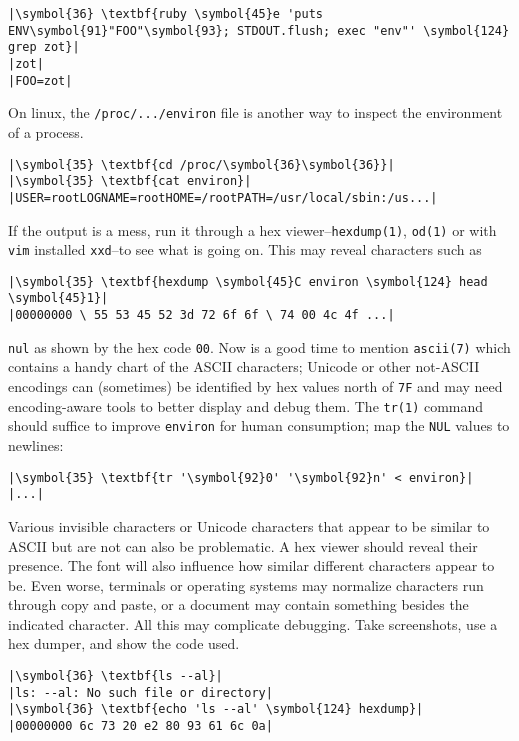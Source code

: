 \documentclass[10pt,a4paper]{article}
\begin{document}
\begin{lstlisting}
|\symbol{36} \textbf{ruby \symbol{45}e 'puts ENV\symbol{91}"FOO"\symbol{93}; STDOUT.flush; exec "env"' \symbol{124} grep zot}|
|zot|
|FOO=zot|
\end{lstlisting}

On linux, the \texttt{/proc/.../environ} file is another way to inspect
the environment of a process.

\begin{lstlisting}
|\symbol{35} \textbf{cd /proc/\symbol{36}\symbol{36}}|
|\symbol{35} \textbf{cat environ}|
|USER=rootLOGNAME=rootHOME=/rootPATH=/usr/local/sbin:/us...|
\end{lstlisting}

If the output is a mess, run it through a hex
viewer--\texttt{hexdump(1)}, \texttt{od(1)} or with \texttt{vim}
installed \texttt{xxd}--to see what is going on. This may reveal
characters such as

\begin{lstlisting}
|\symbol{35} \textbf{hexdump \symbol{45}C environ \symbol{124} head \symbol{45}1}|
|00000000 \ 55 53 45 52 3d 72 6f 6f \ 74 00 4c 4f ...|
\end{lstlisting}

\texttt{nul} as shown by the hex code \texttt{00}. Now is a good time to
mention \texttt{ascii(7)} which contains a handy chart of the ASCII
characters; Unicode or other not-ASCII encodings can (sometimes) be
identified by hex values north of \texttt{7F} and may need
encoding-aware tools to better display and debug them. The
\texttt{tr(1)} command should suffice to improve \texttt{environ} for
human consumption; map the \texttt{NUL} values to newlines:

\begin{lstlisting}
|\symbol{35} \textbf{tr '\symbol{92}0' '\symbol{92}n' < environ}|
|...|
\end{lstlisting}

Various invisible characters or Unicode characters that appear to be
similar to ASCII but are not can also be problematic. A hex viewer
should reveal their presence. The font will also influence how similar
different characters appear to be. Even worse, terminals or operating
systems may normalize characters run through copy and paste, or a
document may contain something besides the indicated character. All this
may complicate debugging. Take screenshots, use a hex dumper, and show
the code used.

\begin{lstlisting}
|\symbol{36} \textbf{ls --al}|
|ls: --al: No such file or directory|
|\symbol{36} \textbf{echo 'ls --al' \symbol{124} hexdump}|
|00000000 6c 73 20 e2 80 93 61 6c 0a|
\end{lstlisting}
\end{document}
